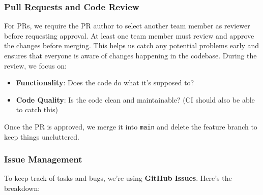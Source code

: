\documentclass{article}
\begin{document}
\subsubsection{Pull Requests and Code Review}

For PRs, we require the PR author to select another team member as reviewer before requesting approval. At least one team member must review and approve the changes before merging. This helps us catch any potential problems early and ensures that everyone is aware of changes happening in the codebase. During the review, we focus on:

\begin{itemize}
    \item \textbf{Functionality}: Does the code do what it's supposed to?

    \item \textbf{Code Quality}: Is the code clean and maintainable? (CI should also be able to catch this)
\end{itemize}

Once the PR is approved, we merge it into \texttt{main} and delete the feature branch to keep things uncluttered.

\subsubsection{Issue Management}

To keep track of tasks and bugs, we're using \textbf{GitHub Issues}. Here's the breakdown:
\end{document}

